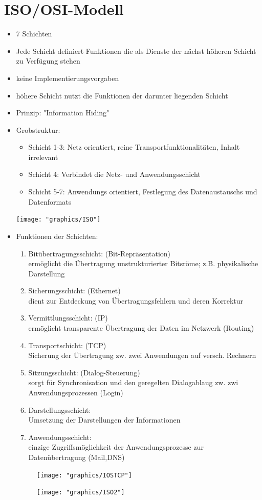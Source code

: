 \documentclass{scrreprt}
\begin{document}
\section{ISO/OSI-Modell}
\begin{itemize}
	\item 7 Schichten
	\item Jede Schicht definiert Funktionen die als Dienste der nächst höheren Schicht zu Verfügung stehen
	\item keine Implementierungsvorgaben
	\item höhere Schicht nutzt die Funktionen der darunter liegenden Schicht
	\item Prinzip: "Information Hiding"
	\item Grobstruktur:
	\begin{itemize}
		\item Schicht 1-3: Netz orientiert, reine Transportfunktionalitäten, Inhalt irrelevant
		\item Schicht 4: Verbindet die Netz- und Anwendungsschicht
		\item Schicht 5-7: Anwendungs orientiert, Festlegung des Datenaustauschs und Datenformats
	\end{itemize}
	\texttt{[image: "graphics/ISO"]}
	\item Funktionen der Schichten:
	\begin{enumerate}
		\item Bitübertragungsschicht: (Bit-Repräsentation)
		\\ermöglicht die Übertragung unstrukturierter Bitsröme; z.B. physikalische Darstellung
		\item Sicherungsschicht: (Ethernet)
		\\dient zur Entdeckung von Übertragungsfehlern und deren Korrektur
		\item Vermittlungsschicht: (IP)
		\\ermöglicht transparente Übertragung der Daten im Netzwerk (Routing)
		\item Transportschicht: (TCP)
		\\Sicherung der Übertragung zw. zwei Anwendungen auf versch. Rechnern
		\item Sitzungsschicht: (Dialog-Steuerung)
		\\sorgt für Synchronisation und den geregelten Dialogablaug zw. zwi Anwendungsprozessen (Login)
		\item Darstellungsschicht: 
		\\Umsetzung der Darstellungen der Informationen
		\item Anwendungsschicht:
		\\einzige Zugriffsmöglichkeit der Anwendungsprozesse zur Datenübertragung (Mail,DNS)
	\end{enumerate}
	\begin{figure}[h]
		\texttt{[image: "graphics/IOSTCP"]}
		\centering
	\end{figure}
	\begin{figure}[h]
		\texttt{[image: "graphics/ISO2"]}
		\centering
	\end{figure}
\end{itemize}
\end{document}
